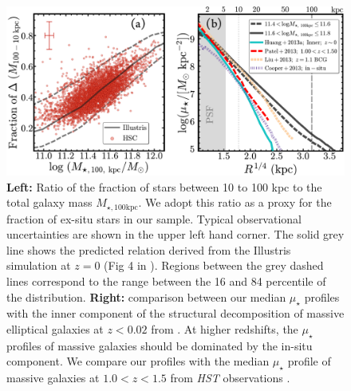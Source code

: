 \documentclass[a4paper,fleqn,usenatbib]{mnras}
\def\mtot{{$M_{\star,100\mathrm{kpc}}$}}
\def\mden{{$\mu_{\star}$}}
\begin{document}
    
     

  \begin{figure}
      \centering 
      \includegraphics[width=\textwidth]{fig/redbcg_insitu_accretion}
      \caption{
          \textbf{Left:} Ratio of the fraction of stars between 10 to 100 kpc to the 
          total galaxy mass \mtot{}. 
          We adopt this ratio as a proxy for the fraction of ex-situ stars in our 
          sample. 
          Typical observational uncertainties are shown in the upper left hand corner. 
          The solid grey line shows the predicted relation  derived from the Illustris
          simulation at $z=0$ (Fig 4 in \citealt{RodriguezGomez2016}). 
          Regions between the grey dashed lines correspond to the range between the 
          16 and 84 percentile of the distribution. 
          \textbf{Right:} comparison between our median \mden{} profiles with the 
          inner component of the structural decomposition of massive elliptical 
          galaxies at $z<0.02$ from \citet[][Cyan, solid]{Huang2013a}.
          At higher redshifts, the \mden{} profiles of massive galaxies should be 
          dominated by the in-situ component. 
          We compare our profiles with the median \mden{} profile of massive galaxies 
          at $1.0 < z < 1.5$ from \textit{HST} observations 
          \citet[][Red, dashed]{Patel2013}. 
}
\end{figure}
\end{document}
